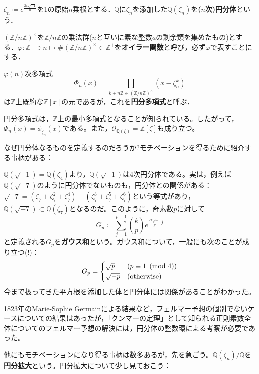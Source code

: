 \vspace{15pt}

\begin{dfn}[円分体]
    $\zeta_n\coloneqq e^{\frac{2\pi\sqrt{-1}}{n}}$を1の原始$n$乗根とする．$\mathds{Q}$に$\zeta_n$を添加した$\mathds{Q}(\zeta_n)$を\textbf{($n$次)円分体}という．
\end{dfn}
\begin{dfn}[オイラー関数]
    $(\mathds{Z}/{n\mathds{Z}})^{\times}$を$\mathds{Z}/{n\mathds{Z}}$の乗法群($n$と互いに素な整数$a$の剰余類を集めたもの)とする．$\varphi\colon\mathds{Z}^+\ni n\mapsto\# (\mathds{Z}/{n\mathds{Z}})^{\times}\in\mathds{Z}^+$を\textbf{オイラー関数}と呼び，必ず$\varphi$で表すことにする．
\end{dfn}
\begin{dfn}[円分多項式]
    $\varphi(n)$次多項式\[
    \Phi_n(x)=\prod_{k+n\mathds{Z}\in(\mathds{Z}/{n\mathds{Z}})^{\times}}(x-\zeta_n^k)
    \]は$\mathds{Z}$上既約な$\mathds{Z}[x]$の元であるが，これを\textbf{円分多項式}と呼ぶ．
\end{dfn}
円分多項式は，$\mathds{Z}$上の最小多項式となることが知られている。したがって，$\Phi_n(x)=\phi_{\zeta_n}(x)$である。また，$\mathcal{O}_{\mathds{Q}(\zeta)}=\mathds{Z}[\zeta]$も成り立つ。

なぜ円分体なるものを定義するのだろうか?モチベーションを得るために紹介する事柄がある：
\begin{mybox}[ガウス和]
    $\mathds{Q}(\sqrt{-1})=\mathds{Q}(\zeta_4)$より，$\mathds{Q}(\sqrt{-1})$は4次円分体である。実は，例えば$\mathds{Q}(\sqrt{-7})$のように円分体でないものも，円分体との関係がある：$\sqrt{-7}=(\zeta_7+\zeta_7^2+\zeta_7^4)-(\zeta_7^3+\zeta_7^5+\zeta_7^6)$という等式があり，$\mathds{Q}(\sqrt{-7})\subset\mathds{Q}(\zeta_7)$となるのだ。このように，奇素数$p$に対して\[
    G_p\coloneqq\sum_{j=1}^{p-1}\left(\frac{k}{p}\right)e^{\frac{2\pi\sqrt{-1}}{p}j}
    \]と定義される$G_p$を\textbf{ガウス和}という。ガウス和について，一般にも次のことが成り立つ(!)：\[
    G_p=\begin{cases*}
        \sqrt{p}&($p\equiv 1\pmod{4}$)\\
        \sqrt{-p}&(otherwise)
    \end{cases*}
    \]今まで扱ってきた平方根を添加した体と円分体には関係があることがわかった。
\end{mybox}
\begin{mybox}
    1823年のMarie-Sophie Germainによる結果など，フェルマー予想の個別でないケースについての結果はあったが，「クンマーの定理」として知られる正則素数全体についてのフェルマー予想の解決には，円分体の整数環による考察が必要であった。
\end{mybox}
他にもモチベーションになり得る事柄は数多あるが，先を急ごう。$\mathds{Q}(\zeta_n)/{\mathds{Q}}$を\textbf{円分拡大}という。円分拡大について少し見ておこう：


